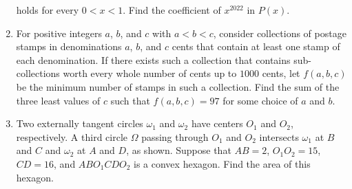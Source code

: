 \documentclass{article}
\begin{document}
\begin{enumerate}[label=\arabic*., itemsep=0.5em]
holds for every $0<x<1.$ Find the coefficient of $x^{2022}$ in $P(x)$.\par \vspace{0.5em}\item For positive integers $a$, $b$, and $c$ with $a < b < c$, consider collections of postage stamps in denominations $a$, $b$, and $c$ cents that contain at least one stamp of each denomination. If there exists such a collection that contains sub-collections worth every whole number of cents up to $1000$ cents, let $f(a, b, c)$ be the minimum number of stamps in such a collection. Find the sum of the three least values of $c$ such that $f(a, b, c) = 97$ for some choice of $a$ and $b$.\par \vspace{0.5em}\item Two externally tangent circles $\omega_1$ and $\omega_2$ have centers $O_1$ and $O_2$, respectively. A third circle $\Omega$ passing through $O_1$ and $O_2$ intersects $\omega_1$ at $B$ and $C$ and $\omega_2$ at $A$ and $D$, as shown. Suppose that $AB = 2$, $O_1O_2 = 15$, $CD = 16$, and $ABO_1CDO_2$ is a convex hexagon. Find the area of this hexagon.


\end{enumerate}
\end{document}
